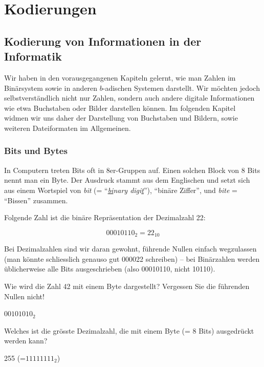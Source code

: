 \chapter{Kodierungen}
\section{Kodierung von Informationen in der Informatik}

Wir haben in den vorausgegangenen Kapiteln gelernt, wie man Zahlen im Binärsystem sowie in anderen $b$-adischen Systemen darstellt. Wir möchten jedoch selbstverständlich nicht nur Zahlen, sondern auch andere digitale Informationen wie etwa Buchstaben oder Bilder darstellen können. Im folgenden Kapitel widmen wir uns daher der Darstellung von Buchstaben und Bildern, sowie weiteren Dateiformaten im Allgemeinen.

\subsection{Bits und Bytes}
In Computern treten Bits oft in 8er-Gruppen auf. Einen solchen Block von 8 Bits nennt man ein Byte. Der Ausdruck stammt aus dem Englischen und setzt sich aus einem Wortspiel von \textit{bit} (= ``\textit{\underline{bi}nary digi\underline{t}}''), ``binäre Ziffer'', und \textit{bite} = ``Bissen'' zusammen. 

Folgende Zahl ist die binäre Repräsentation der Dezimalzahl 22:

\[00010110_2 = 22_{10}\]

Bei Dezimalzahlen sind wir daran gewohnt, führende Nullen einfach wegzulassen (man könnte schliesslich genauso gut 000022 schreiben) – bei Binärzahlen werden üblicherweise alle Bits ausgeschrieben (also 00010110, nicht 10110).

\begin{myexercise}
Wie wird die Zahl 42 mit einem Byte dargestellt? Vergessen Sie die führenden Nullen nicht!
\begin{myanswer}
$00101010_2$
\end{myanswer}
\end{myexercise}

\begin{myexercise}
\label{ex:byte-max}
Welches ist die grösste Dezimalzahl, die mit einem Byte (= 8 Bits) ausgedrückt werden kann?
\begin{myanswer}
255 (=$11111111_2$)
\end{myanswer}
\end{myexercise}




